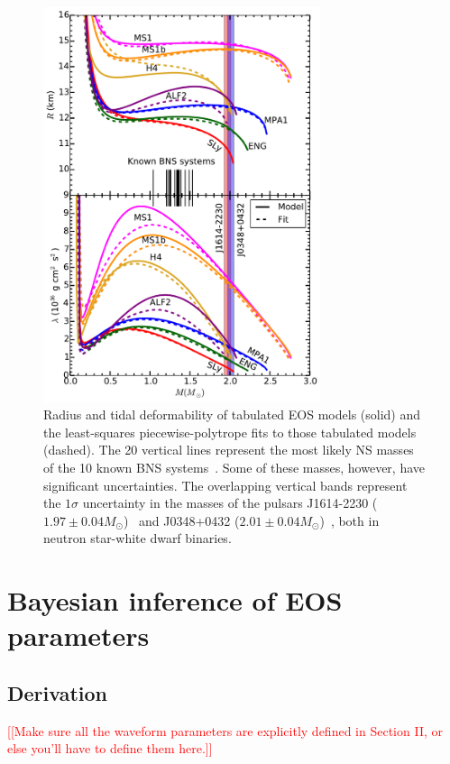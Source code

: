 \documentclass[twocolumn,prd,amssymb,aps,nofootinbib,showpacs,epsf]{revtex4}
\newcommand{\red}{\textcolor{red}}
\begin{document}
\begin{figure}[!htb]
\begin{center}
\includegraphics[width=3.2in]{Radiuslambda.pdf}
\caption{Radius and tidal deformability of tabulated EOS models (solid) and the least-squares piecewise-polytrope fits to those tabulated models (dashed). The 20 vertical lines represent the most likely NS masses of the 10 known BNS systems~\cite{Lattimer2012}. Some of these masses, however, have significant uncertainties. The overlapping vertical bands represent the $1\sigma$ uncertainty in the masses of the pulsars J1614-2230 ($1.97\pm0.04M_\odot$)~\cite{DemorestPennucciRansom2010} and J0348+0432 ($2.01\pm0.04M_\odot$)~\cite{AntoniadisFreireWex2013}, both in neutron star-white dwarf binaries.}
\label{fig:rlofm}
\end{center}
\end{figure}


\section{Bayesian inference of EOS parameters}
\label{sec:bayes}

\subsection{Derivation}

\red{[[Make sure all the waveform parameters are explicitly defined in Section II, or else you'll have to define them here.]]}
\end{document}
